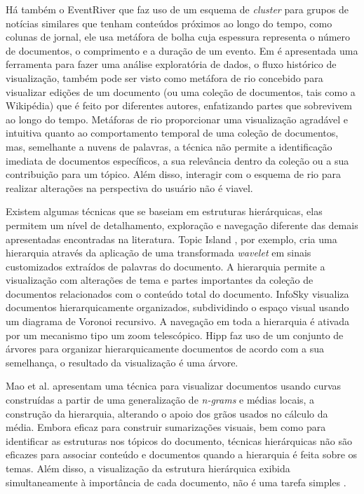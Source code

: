 Há também o EventRiver \cite{luo2012eventriver} que faz uso de um esquema de \textit{cluster} para grupos de notícias similares que tenham conteúdos próximos ao longo do tempo, como colunas de jornal, ele usa metáfora de bolha cuja espessura representa o número de documentos, o comprimento e a duração de um evento. Em  \cite{viegas2004studying} é apresentada uma ferramenta para fazer uma análise exploratória de dados, o fluxo histórico de visualização, também pode ser visto como metáfora de rio concebido para visualizar edições de um documento (ou uma coleção de documentos, tais como a Wikipédia) que é feito por diferentes autores, enfatizando partes que sobrevivem ao longo do tempo. Metáforas de rio proporcionar uma visualização agradável e intuitiva quanto ao comportamento temporal de uma coleção de documentos, mas, semelhante a nuvens de palavras, a técnica não permite a identificação imediata de documentos específicos, a sua relevância dentro da coleção ou a sua contribuição para um tópico. Além disso, interagir com o esquema de rio para realizar alterações na perspectiva do usuário não é viavel.



Existem algumas técnicas que se baseiam em estruturas hierárquicas, elas permitem um nível de detalhamento, exploração e navegação diferente das demais apresentadas encontradas na literatura. Topic Island \cite{miller1998topic}, por exemplo, cria uma hierarquia através da aplicação de uma transformada \textit{wavelet} em sinais customizados extraídos de palavras do documento. A hierarquia permite a visualização com alterações de tema e partes importantes da coleção de documentos relacionados com o conteúdo total do documento.
InfoSky \cite{andrews2002infosky} visualiza documentos hierarquicamente organizados, subdividindo o espaço visual usando um diagrama de Voronoi recursivo. A navegação em toda a hierarquia é ativada por um mecanismo tipo um zoom telescópico. Hipp \cite{paulovich2008hipp} faz uso de um conjunto de árvores para organizar hierarquicamente documentos de acordo com a sua semelhança, o resultado da visualização é uma árvore. 

Mao et al.\cite{mao2007sequential} apresentam uma técnica para visualizar documentos usando curvas construídas a partir de uma generalização de \emph{n-grams} e médias locais, a construção da hierarquia, alterando o apoio dos grãos usados no cálculo da média. Embora eficaz para construir sumarizações visuais, bem como para identificar as estruturas nos tópicos do documento, técnicas hierárquicas não são eficazes para associar conteúdo e documentos quando a hierarquia é feita sobre os temas. Além disso, a visualização da estrutura hierárquica exibida simultaneamente à importância de cada documento, não é uma tarefa simples \cite{pagliosa2013mist}.

